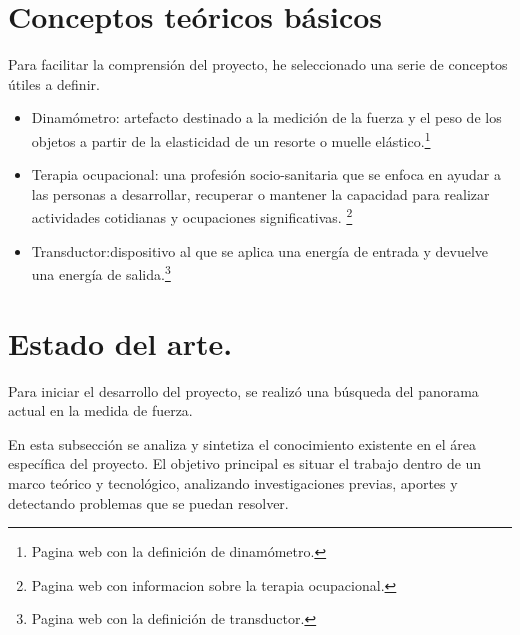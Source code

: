 \section{Conceptos teóricos básicos}
Para facilitar la comprensión del proyecto, he seleccionado una serie de conceptos útiles a definir. 
\begin{itemize}
    \item Dinamómetro: artefacto destinado a la medición de la fuerza y el peso de los objetos a partir de la elasticidad de un resorte o muelle elástico.\cite{Dinamometro}\footnote{Pagina web con la definición de dinamómetro\cite{Dinamometro}.}
    \item Terapia ocupacional: una profesión socio-sanitaria que se enfoca en ayudar a las personas a desarrollar, recuperar o mantener la capacidad para realizar actividades cotidianas y ocupaciones significativas. \cite{T.O}\footnote{Pagina web con informacion sobre la terapia ocupacional\cite{T.O}.}
    \item Transductor:dispositivo al que se aplica una energía de entrada y devuelve una energía de salida.\cite{celulas_extensométricas}\footnote{Pagina web con la definición de transductor\cite{celulas_extensométricas}.}

\end{itemize}

\section{Estado del arte.}

Para iniciar el desarrollo del proyecto, se realizó una búsqueda del panorama actual en la medida de fuerza. 

En esta subsección se analiza y sintetiza el conocimiento existente en el área específica del proyecto. El objetivo principal es situar el trabajo dentro de un marco teórico y tecnológico, analizando investigaciones previas, aportes y detectando problemas que se puedan resolver.

